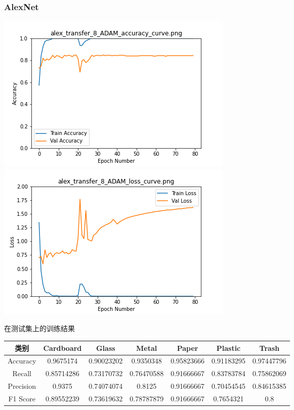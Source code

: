 \documentclass[UTF8]{ctexart}
\begin{document}
\subsubsection{AlexNet}
 \includegraphics[scale=0.5]{image/alex_transfer_8_ADAM_accuracy_curve.png} 
\includegraphics[scale=0.5]{image/alex_transfer_8_ADAM_loss_curve.png} 


在测试集上的训练结果

\begin{tabular}{|c|c|c|c|c|c|c|}
\hline 
类别 & Cardboard & Glass & Metal & Paper & Plastic & Trash \\ 
\hline 
Accuracy &0.9675174 & 0.90023202 &0.9350348 & 0.95823666& 0.91183295& 0.97447796 \\
 \hline 
Recall &0.85714286& 0.73170732 &0.76470588& 0.91666667 &0.83783784& 0.75862069 \\ 
\hline 
Precision &0.9375    & 0.74074074& 0.8125    & 0.91666667& 0.70454545& 0.84615385 \\ 
\hline 
F1 Score &0.89552239& 0.73619632 &0.78787879& 0.91666667& 0.7654321 & 0.8 \\ 
\hline 
\end{tabular} 
\end{document}
